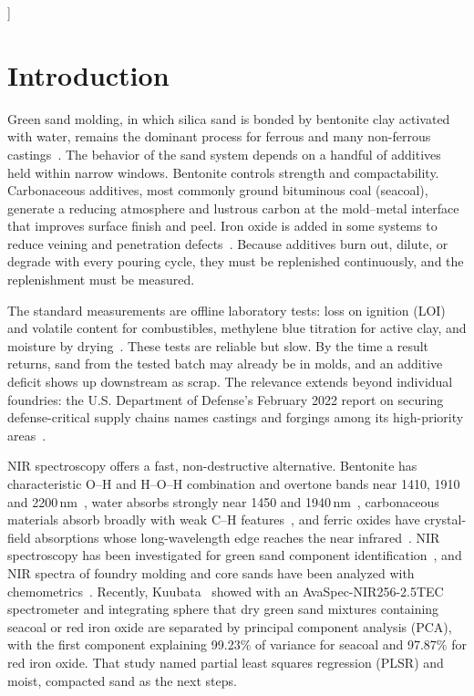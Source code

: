 \documentclass[10pt,twocolumn,letterpaper]{article}
\begin{document}
\vspace{14pt}
]

\section{Introduction}

Green sand molding, in which silica sand is bonded by bentonite clay activated with water, remains the dominant process for ferrous and many non-ferrous castings~\cite{brown2000}. The behavior of the sand system depends on a handful of additives held within narrow windows. Bentonite controls strength and compactability. Carbonaceous additives, most commonly ground bituminous coal (seacoal), generate a reducing atmosphere and lustrous carbon at the mold--metal interface that improves surface finish and peel. Iron oxide is added in some systems to reduce veining and penetration defects~\cite{brown2000,afs2015}. Because additives burn out, dilute, or degrade with every pouring cycle, they must be replenished continuously, and the replenishment must be measured.

The standard measurements are offline laboratory tests: loss on ignition (LOI) and volatile content for combustibles, methylene blue titration for active clay, and moisture by drying~\cite{afs2015}. These tests are reliable but slow. By the time a result returns, sand from the tested batch may already be in molds, and an additive deficit shows up downstream as scrap. The relevance extends beyond individual foundries: the U.S. Department of Defense's February 2022 report on securing defense-critical supply chains names castings and forgings among its high-priority areas~\cite{dod2022}.

NIR spectroscopy offers a fast, non-destructive alternative. Bentonite has characteristic O--H and H--O--H combination and overtone bands near 1410, 1910 and 2200\,nm~\cite{clark1990,bishop1994}, water absorbs strongly near 1450 and 1940\,nm~\cite{segelstein1981,hale1973}, carbonaceous materials absorb broadly with weak C--H features~\cite{workman2012}, and ferric oxides have crystal-field absorptions whose long-wavelength edge reaches the near infrared~\cite{sherman1985}. NIR spectroscopy has been investigated for green sand component identification~\cite{giese2014}, and NIR spectra of foundry molding and core sands have been analyzed with chemometrics~\cite{dungan2007}. Recently, Kuubata~\cite{kuubata2025} showed with an AvaSpec-NIR256-2.5TEC spectrometer and integrating sphere that dry green sand mixtures containing seacoal or red iron oxide are separated by principal component analysis (PCA), with the first component explaining 99.23\% of variance for seacoal and 97.87\% for red iron oxide. That study named partial least squares regression (PLSR) and moist, compacted sand as the next steps.
\end{document}
